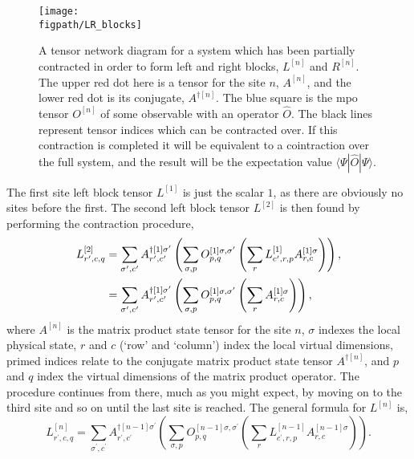 \begin{figure}[ht!]
\centering
\texttt{[image: \\figpath/LR\_blocks]}
\caption{A tensor network diagram for a system which has been partially contracted in order to form left and right blocks, \(L^{[n]}\) and \(R^{[n]}\). The upper red dot here is a tensor for the site \(n\), \(A^{[n]}\), and the lower red dot is its conjugate, \(A^{\dagger [n]}\). The blue square is the mpo tensor \(O^{[n]}\) of some observable with an operator \(\hat{O}\). The black lines represent tensor indices which can be contracted over. If this contraction is completed it will be equivalent to a cointraction over the full system, and the result will be the expectation value \(\langle \Psi | \hat{O} | \Psi \rangle \).}
\label{fig:vs1-2}
\end{figure}

The first site left block tensor \(L^{[1]}\) is just the scalar \(1\), as there are obviously no sites before the first. The second left block tensor \(L^{[2]}\) is then found by performing the contraction procedure,
\begin{align}
L^{[2]}_{r^{\prime}, c, q} &= \sum_{\sigma^{\prime}, c^{\prime}} A^{\dagger [1] \sigma^{\prime}}_{r^{\prime}, c^{\prime}} \left( \sum_{\sigma, p} O^{[1]  \sigma, \sigma^{\prime}}_{p, q} \left( \sum_{r} L^{[1]}_{c^{\prime}, r, p} A^{[1] \sigma}_{r, c} \right) \right), \notag \\
&= \sum_{\sigma^{\prime}, c^{\prime}} A^{\dagger [1] \sigma^{\prime}}_{r^{\prime}, c^{\prime}} \left( \sum_{\sigma, p} O^{[1]  \sigma, \sigma^{\prime}}_{p, q} \left( \sum_{r} A^{[1] \sigma}_{r, c} \right) \right),
\label{eq:vs1-3}
\end{align}
where \(A^{[n]}\) is the matrix product state tensor for the site \(n\), \(\sigma\) indexes the local physical state, \(r\) and \(c\) (`row' and `column') index the local virtual dimensions, primed indices relate to the conjugate matrix product state tensor \(A^{\dagger [n]}\), and \(p\) and \(q\) index the virtual dimensions of the matrix product operator. The procedure continues from there, much as you might expect, by moving on to the third site and so on until the last site is reached. The general formula for \(L^{[n]}\) is,
\begin{equation} 
L^{[n]}_{r^{\prime}, c, q} = \sum_{\sigma^{\prime}, c^{\prime}} A^{\dagger [n-1] \sigma^{\prime}}_{r^{\prime}, c^{\prime}} \left( \sum_{\sigma, p} O^{[n-1]  \sigma, \sigma^{\prime}}_{p, q} \left( \sum_{r} L^{[n-1]}_{c^{\prime}, r, p} A^{[n-1] \sigma}_{r, c} \right) \right).
\label{eq:vs1-4}
\end{equation}

